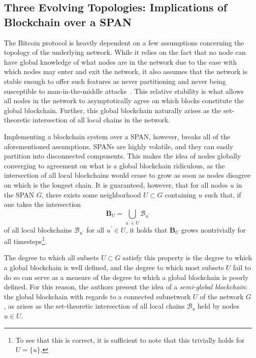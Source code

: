 \subsection{Three Evolving Topologies: Implications of Blockchain over a SPAN}

The Bitcoin protocol is heavily dependent on a few assumptions concerning
the topology of the underlying network. While it relies on the fact that no
node can have global knowledge of what nodes are in the network due to the
ease with which nodes may enter and exit the network, it also assumes that the
network is stable enough to offer such features as never partitioning and never
being susceptible to man-in-the-middle attacks~\cite{nakamoto2008bitcoin}. This
relative stability is what allows all nodes in the network to asymptotically
agree on which blocks constitute the global blockchain. Further, this global
blockchain naturally arises as the set-theoretic intersection of all local 
chains in the network.

Implementing a blockchain system over a SPAN, however, breaks all of the
aforementioned assumptions. SPANs are highly volatile, and they can easily
partition into disconnected components. This makes the idea of nodes
globally converging to agreement on what is a global blockchain ridiculous, as
the intersection of all local blockchains would cease to grow as soon as
nodes disagree on which is the longest chain. It is guaranteed, however,
that for all nodes $u$ in the SPAN $G$, there exists some neighborhood
$U\subset G$ containing $u$ such that, if one takes the intersection
$$\mathbf{B}_U=\bigcup_{u^\prime\in U}\mathcal{B}_{u^\prime}$$
of all local blockchains $\mathcal{B}_{u^\prime}$ for all $u^\prime\in U$, 
it holds that $\mathbf{B}_U$ grows nontrivially for all timesteps\footnote{To 
	see that this is correct, it is sufficient to note that this trivially
	holds for $U=\{u\}$.}.

The degree to which all subsets $U\subset G$ satisfy this property is the
degree to which a global blockchain is well defined, and the degree to which
most subsets $U$ fail to do so can serve as a measure of the degree to which
a global blockchain is poorly defined. For this reason, the authors present
the idea of a \textit{semi-global blockchain}: the global blockchain with regards
to a connected subnetwork $U$ of the network $G$, as arises
as the set-theoretic intersection of all local chains $\mathcal{B}_u$ held by
nodes $u\in U$.

